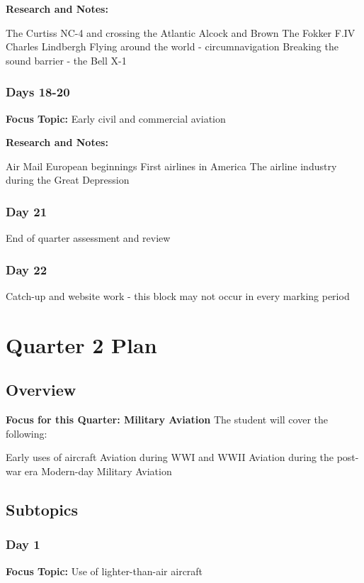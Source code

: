 \documentclass[12pt]{article}
\begin{document}
\textbf{Research and Notes:}
\begin{outline}
    \1 The Curtiss NC-4 and crossing the Atlantic
\1 Alcock and Brown
\1 The Fokker F.IV
\1 Charles Lindbergh
\1 Flying around the world - circumnavigation
\1 Breaking the sound barrier - the Bell X-1
\end{outline}

\subsubsection{Days 18-20}
\textbf{Focus Topic:} Early civil and commercial aviation

\textbf{Research and Notes:}
\begin{outline}
    \1 Air Mail
\1 European beginnings
\1 First airlines in America
\1 The airline industry during the Great Depression
\end{outline}
\subsubsection{Day 21}
End of quarter assessment and review
\subsubsection{Day 22}
Catch-up and website work - this block may not occur in every marking period

\section{Quarter 2 Plan}
\subsection{Overview}
\textbf{Focus for this Quarter: Military Aviation}
The student will cover the following:
\begin{outline}
    \1 Early uses of aircraft
\1 Aviation during WWI and WWII
\1 Aviation during the post-war era
\1 Modern-day Military Aviation
\end{outline}
\subsection{Subtopics}
\subsubsection{Day 1}
\textbf{Focus Topic:} Use of lighter-than-air aircraft
\end{document}
